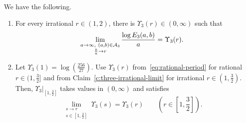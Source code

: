 \begin{proposition}\label{prop:three-irrational}
We have the following.
\begin{enumerate}
\item\label{c:three-irrational-limit} For every irrational $r\in(1,2)$,
there is $\Upsilon_3(r)\in(0,\infty)$ such that
\[
 \lim_{\substack{a\to\infty,\ (a,b)\in\cA_3\\\frac{b}{a}\to r}}
 \frac{\log E_3(a,b)}a=\Upsilon_3(r).
\]
\item\label{c:three-irrational-continuity} Let $\Upsilon_3(1)=\log\left(\frac{256}{27}\right)$.
Use $\Upsilon_3(r)$ from~\eqref{eq:rational-period} for rational $r\in(1,\frac32]$ and from Claim~\ref{c:three-irrational-limit} for irrational $r\in(1,\frac32)$.
Then, $\Upsilon_3|_{[1,\frac32]}$ takes values in $(0,\infty)$ and satisfies
\[
 \lim_{\substack{s\to r\\s\in[1,\frac32]}}\Upsilon_3(s)=\Upsilon_3(r)
 \qquad\left(r\in[1,\frac32]\right).
\]
\end{enumerate}
\end{proposition}
